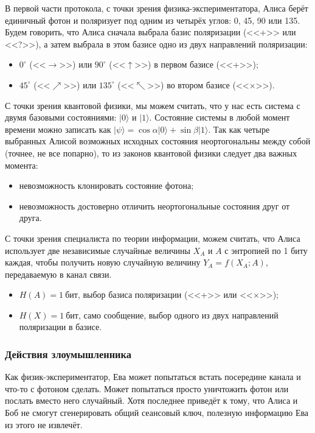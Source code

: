 В первой части протокола, с точки зрения физика-экспериментатора, Алиса берёт единичный фотон и поляризует под одним из четырёх углов: 0, 45, 90 или 135. Будем говорить, что Алиса сначала выбрала базис поляризации (<<+>> или <<?>>), а затем выбрала в этом базисе одно из двух направлений поляризации:

\begin{itemize}
	\item $0^{\circ}$ (<<$\rightarrow$>>) или $90^{\circ}$ (<<$\uparrow$>>) в первом базисе (<<+>>);
	\item $45^{\circ}$ (<<$\nearrow$>>) или $135^{\circ}$ (<<$\nwarrow$>>) во втором базисе (<<×>>).
\end{itemize}

С точки зрения квантовой физики, мы можем считать, что у нас есть система с двумя базовыми состояниями: $|0\rangle$ и $|1\rangle$. Состояние системы в любой момент времени можно записать как $| \psi \rangle = \cos \alpha |0\rangle + \sin \beta |1\rangle$. Так как четыре выбранных Алисой возможных исходных состояния неортогональны между собой (точнее, не все попарно), то из законов квантовой физики следует два важных момента:

\begin{itemize}
	\item невозможность клонировать состояние фотона;
	\item невозможность достоверно отличить неортогональные состояния друг от друга.
\end{itemize}

С точки зрения специалиста по теории информации, можем считать, что Алиса использует две независимые случайные величины $X_A$ и $A$ с энтропией по 1 биту каждая, чтобы получить новую случайную величину $Y_A = f \left( X_A; A \right)$, передаваемую в канал связи.

\begin{itemize}
	\item $H \left( A \right) = 1~\text{бит}$, выбор базиса поляризации (<<+>> или <<×>>);
	\item $H \left( X \right) = 1~\text{бит}$, само сообщение, выбор одного из двух направлений поляризации в базисе.
\end{itemize}

\subsubsection{Действия злоумышленника}

Как физик-экспериментатор, Ева может попытаться встать посередине канала и что-то с фотоном сделать. Может попытаться просто уничтожить фотон или послать вместо него случайный. Хотя последнее приведёт к тому, что Алиса и Боб не смогут сгенерировать общий сеансовый ключ, полезную информацию Ева из этого не извлечёт.

